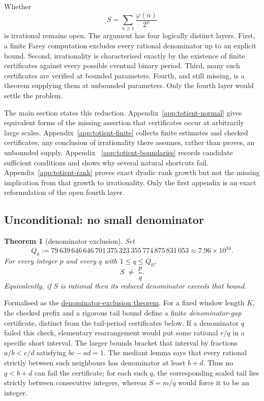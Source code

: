 \documentclass[11pt]{article}
\newcommand{\commit}{ebc98ee71f6819bd9fe344a0bb343542c604e533}
\newcommand{\repobase}{https://github.com/wcook04/plectis-lean-erdos249-257/blob/\commit}
\newcommand{\PK}{Erdos249257}
\newcommand{\lword}[4]{\href{\repobase/\PK/#1\#L#2}{#4}}
\newtheorem{theorem}{Theorem}[section]
\theoremstyle{definition}
\theoremstyle{remark}
\newcommand{\ph}{\varphi}
\newcommand{\Qzero}{Q_0}
\begin{document}
Whether
\[
S=\sum_{n\ge1}\frac{\ph(n)}{2^n}
\]
is irrational remains open.  The argument has four logically distinct
layers.  First, a finite Farey computation excludes every rational
denominator up to an explicit bound.  Second, irrationality is characterised
exactly by the existence of finite certificates against every possible
eventual binary period.  Third, many such certificates are verified at
bounded parameters.  Fourth, and still missing, is a theorem supplying them
at unbounded parameters.  Only the fourth layer would settle the problem.

The main section states this reduction.  Appendix~\ref{app:totient-normal}
gives equivalent forms of the missing assertion that certificates occur at
arbitrarily large scales.  Appendix~\ref{app:totient-finite} collects finite
estimates and checked certificates; any conclusion of irrationality there
assumes, rather than proves, an unbounded supply.  Appendix~
\ref{app:totient-boundaries} records candidate sufficient conditions and
shows why several natural shortcuts fail.  Appendix~\ref{app:totient-rank}
proves exact dyadic rank growth but not the missing implication from that
growth to irrationality.  Only the first appendix is an exact reformulation
of the open fourth layer.

\subsection{Unconditional: no small denominator}\label{sec:uncond}

\begin{theorem}[denominator exclusion]\label{res:farey}
Set
\[
\Qzero:=79\,639\,646\,646\,701\,375\,323\,355\,774\,875\,831\,053
       \approx7.96\times10^{34}.
\]
For every integer $p$ and every $q$ with $1\le q\le\Qzero$,
\[
S \;\ne\; \frac{p}{q}.
\]
Equivalently, if $S$ is rational then its reduced denominator exceeds that bound.
\end{theorem}
\noindent Formalised as the
\lword{CertificateKernel.lean}{18056}{tsum_totient_div_pow_two_ne_ratCast_of_den_le_79639646646701375323355774875831053}{denominator-exclusion theorem}.
For a fixed window length $K$, the checked prefix and a rigorous tail bound
define a finite \emph{denominator-gap} certificate, distinct from the
tail-period certificates below.  If a denominator $q$ failed this check,
elementary rearrangement would put some rational $r/q$ in a specific short
interval.  The larger bounds bracket that interval by fractions
$a/b<c/d$ satisfying $bc-ad=1$.  The mediant lemma says that every rational
strictly between such neighbours has denominator at least $b+d$.  Thus no
$q<b+d$ can fail the certificate; for each such $q$, the corresponding scaled
tail lies strictly between consecutive integers, whereas $S=m/q$ would force it
to be an integer.
\end{document}
